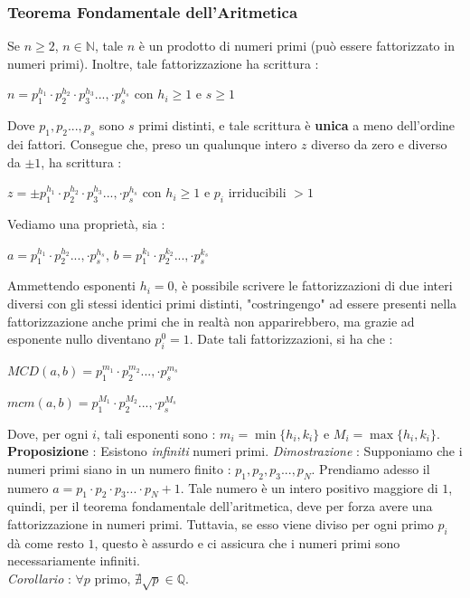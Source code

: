 \documentclass[12pt, letterpaper]{article}
\begin{document}
\subsubsection{Teorema Fondamentale dell'Aritmetica}
Se \(n\ge 2\), \(n\in \mathbb{N}\), tale \(n\) è un prodotto di numeri primi (può essere fattorizzato in numeri primi).
Inoltre, tale fattorizzazione ha scrittura : \begin{center}
    \( n=p_1^{h_1}\cdot p_2^{h_2} \cdot p_3^{h_3} ...,\cdot p_s^{h_s}   \) con \(h_i\ge1\) e \(s\ge 1\)
\end{center}
Dove \(p_1,p_2...,p_s\) sono \(s\) primi distinti, e tale scrittura è \textbf{unica} a meno dell'ordine dei fattori.
Consegue che, preso un qualunque intero \(z\) diverso da zero e diverso da \(\pm1\), ha scrittura :
\begin{center}
    \( z=\pm p_1^{h_1}\cdot p_2^{h_2} \cdot p_3^{h_3} ...,\cdot p_s^{h_s}   \) con \(h_i\ge1\) e \(p_i\) irriducibili \(> 1\)
\end{center}
Vediamo una proprietà, sia : 
\begin{center}
    \(
    a=p_1^{h_1}\cdot p_2^{h_2} ...,\cdot p_s^{h_s}\),\hphantom{spacespace}   \( b=p_1^{k_1}\cdot p_2^{k_2}...,\cdot p_s^{k_s}  \) 
   
\end{center}
Ammettendo esponenti \(h_i=0\), è possibile scrivere le fattorizzazioni di due interi diversi con gli stessi 
identici primi distinti, "costringengo" ad essere presenti nella fattorizzazione anche primi che in 
realtà non apparirebbero, ma grazie ad esponente nullo diventano \(p_i^0=1\). Date tali fattorizzazioni, 
si ha che :
\begin{center}
    \(MCD(a,b)=p_1^{m_1}\cdot p_2^{m_2}...,\cdot p_s^{m_s}\)
\end{center}
\begin{center}
    \(mcm(a,b)=p_1^{M_1}\cdot p_2^{M_2}...,\cdot p_s^{M_s}\)
\end{center}
Dove, per ogni \(i\), tali esponenti sono : \(m_i=\min\{h_i,k_i\}\) e \(M_i=\max\{h_i,k_i\}\).
\\\textbf{Proposizione} : Esistono \textit{infiniti} numeri primi. \textit{Dimostrazione} : Supponiamo che i 
numeri primi siano in un numero finito : \(p_1,p_2,p_3...,p_N\). Prendiamo adesso il numero
 \(a=p_1\cdot p_2\cdot p_3...\cdot p_N+1\). Tale numero è un intero positivo maggiore di \(1\), quindi, per il 
 teorema fondamentale dell'aritmetica, deve per forza avere una fattorizzazione in numeri primi. Tuttavia, se esso 
 viene diviso per ogni primo \(p_i\) dà come resto \(1\), questo è assurdo e ci assicura che i numeri primi 
 sono necessariamente infiniti.\\
 \textit{Corollario} : \(\forall p\) primo, \(\nexists \sqrt{p}\in \mathbb{Q}\).
\end{document}
